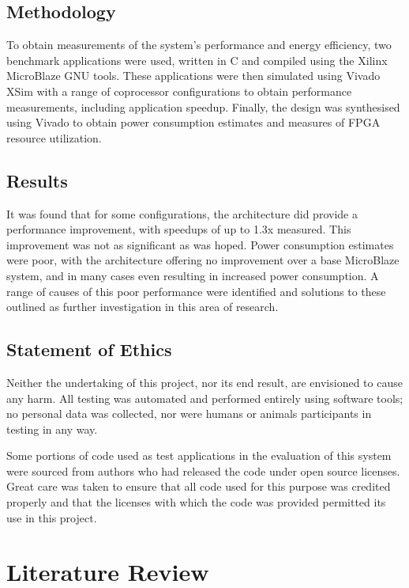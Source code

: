 \documentclass{UoYCSproject}
\begin{document}
\begin{summary}
\section{Methodology}

To obtain measurements of the system's performance and energy efficiency, two benchmark applications were used,
written in C and compiled using the Xilinx MicroBlaze GNU tools. These applications were then simulated using Vivado XSim
with a range of coprocessor configurations to obtain performance measurements, including application speedup.
Finally, the design was synthesised using Vivado to obtain power consumption estimates and measures of FPGA resource
utilization.

\section{Results}

It was found that for some configurations, the architecture did provide a performance improvement, with speedups of
up to 1.3x measured. This improvement was not as significant as was hoped. Power consumption estimates were poor,
with the architecture offering no improvement over a base MicroBlaze system, and in many cases even resulting in increased
power consumption. A range of causes of this poor performance were identified and solutions to these outlined as further
investigation in this area of research.

\section{Statement of Ethics}

Neither the undertaking of this project, nor its end result, are envisioned to cause any harm.
All testing was automated and performed entirely using software tools; no personal data was collected, nor were humans
or animals participants in testing in any way.

Some portions of code used as test applications in the evaluation of this system were sourced
from authors who had released the code under open source licenses. Great care was taken to ensure that all
code used for this purpose was credited properly and that the licenses with which the code was
provided permitted its use in this project.

\end{summary}

\chapter{Literature Review}
\end{document}
